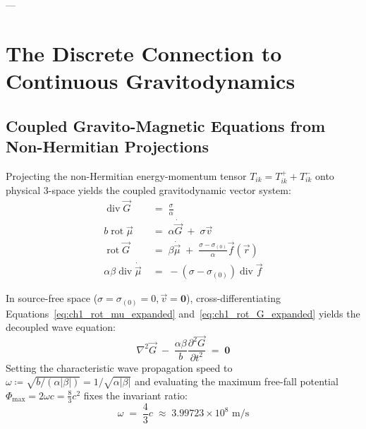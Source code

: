 \documentclass[
    12pt,
    a4paper,
    headings=normal,
    twoside=false,
    open=any,
    parskip=half
]{scrbook}
\begin{document}
---

\section{The Discrete Connection to Continuous Gravitodynamics}
\label{sec:ch1_discrete_to_gravitodynamics}

\subsection{Coupled Gravito-Magnetic Equations from Non-Hermitian Projections}

Projecting the non-Hermitian energy-momentum tensor $T_{ik} = T_{ik}^+ + T_{ik}^-$ onto physical 3-space yields the coupled gravitodynamic vector system:
\begin{align}
\operatorname{div}\vec{G} &\;=\; \frac{\sigma}{\alpha} \label{eq:ch1_div_G_expanded} \\
b \operatorname{rot}\vec{\mu} &\;=\; \alpha \dot{\vec{G}} \;+\; \sigma \vec{v} \label{eq:ch1_rot_mu_expanded} \\
\operatorname{rot}\vec{G} &\;=\; \beta \dot{\vec{\mu}} \;+\; \frac{\sigma - \sigma_{(0)}}{\alpha}\vec{f}(\vec{r}) \label{eq:ch1_rot_G_expanded} \\
\alpha\beta \operatorname{div}\dot{\vec{\mu}} &\;=\; -\left( \sigma - \sigma_{(0)} \right) \operatorname{div}\vec{f} \label{eq:ch1_div_mu_expanded}
\end{align}

\begin{phystheorem}[Invariant Wave Speed $\omega = \frac{4}{3}c$]\label{thm:ch1_invariant_wave_speed_four_thirds}
In source-free space ($\sigma = \sigma_{(0)} = 0, \vec{v} = \mathbf{0}$), cross-differentiating Equations~\eqref{eq:ch1_rot_mu_expanded} and~\eqref{eq:ch1_rot_G_expanded} yields the decoupled wave equation:
\begin{equation}
\nabla^2\vec{G} \;-\; \frac{\alpha\beta}{b} \frac{\partial^2\vec{G}}{\partial t^2} \;=\; \mathbf{0}
\end{equation}
Setting the characteristic wave propagation speed to $\omega \coloneqq \sqrt{b / (\alpha|\beta|)} = 1/\sqrt{\alpha|\beta|}$ and evaluating the maximum free-fall potential $\Phi_{\max} = 2\omega c = \frac{8}{3}c^2$ fixes the invariant ratio:
\begin{equation}
\boxed{\omega \;=\; \frac{4}{3}c \;\approx\; 3.99723 \times 10^8 \text{ m/s}}
\label{eq:ch1_omega_four_thirds_exact}
\end{equation}
\end{phystheorem}
\end{document}
